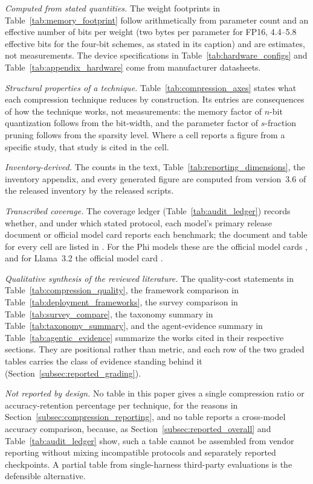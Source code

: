 \emph{Computed from stated quantities.} The weight footprints in
Table~\ref{tab:memory_footprint} follow arithmetically from parameter count and
an effective number of bits per weight (two bytes per parameter for FP16, 4.4--5.8
effective bits for the four-bit schemes, as stated in its caption) and are
estimates, not measurements. The device specifications in
Table~\ref{tab:hardware_configs} and Table~\ref{tab:appendix_hardware} come from
manufacturer datasheets.

\emph{Structural properties of a technique.} Table~\ref{tab:compression_axes}
states what each compression technique reduces by construction. Its entries are
consequences of how the technique works, not measurements: the memory factor of
$n$-bit quantization follows from the bit-width, and the parameter factor of
$s$-fraction pruning follows from the sparsity level. Where a cell reports a
figure from a specific study, that study is cited in the cell.

\emph{Inventory-derived.} The counts in the text, Table~\ref{tab:reporting_dimensions}, the inventory appendix, and every generated figure are computed from version~3.6 of the released inventory by the released scripts.

\emph{Transcribed coverage.} The coverage ledger (Table~\ref{tab:audit_ledger}) records whether, and under which stated protocol, each model's primary release document or official model card reports each benchmark; the document and table for every cell are listed in . For the Phi models these are the official model cards \citep{microsoft2025phi4minicard}, and for Llama~3.2 the official model card \citep{meta2024llama32card}.

\emph{Qualitative synthesis of the reviewed literature.} The quality-cost
statements in Table~\ref{tab:compression_quality}, the framework comparison in
Table~\ref{tab:deployment_frameworks}, the survey comparison in
Table~\ref{tab:survey_compare}, the taxonomy summary in
Table~\ref{tab:taxonomy_summary}, and the agent-evidence summary in
Table~\ref{tab:agentic_evidence} summarize the works cited in their respective
sections. They are positional rather than metric, and each row of the two graded
tables carries the class of evidence standing behind it
(Section~\ref{subsec:reported_grading}).

\emph{Not reported by design.} No table in this paper gives a single compression
ratio or accuracy-retention percentage per technique, for the reasons in
Section~\ref{subsec:compression_reporting}, and no table reports a cross-model
accuracy comparison, because, as Section~\ref{subsec:reported_overall} and
Table~\ref{tab:audit_ledger} show, such a table cannot be assembled from vendor
reporting without mixing incompatible protocols and separately reported
checkpoints. A partial table from single-harness third-party evaluations is the
defensible alternative.

